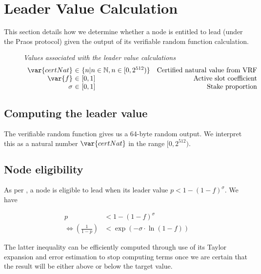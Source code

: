 \newcommand{\N}{\ensuremath{\mathbb{N}}}
\newcommand{\nonceOp}{\star}

\section{Leader Value Calculation}
\label{sec:leader-value-calc}

This section details how we determine whether a node is entitled to lead (under
the Praos protocol) given the output of its verifiable random function
calculation.

\begin{figure}
  \emph{Values associated with the leader value calculations}
  \begin{equation*}
  \begin{array}{r@{~\in~}lr}
    \var{certNat} & \{n | n \in \N, n \in [0,2^{512})\} & \text{Certified natural value from VRF} \\
    \var{f} & [0,1] & \text{Active slot coefficient} \\
    \sigma & [0,1] & \text{Stake proportion}
  \end{array}
  \end{equation*}
\end{figure}

\subsection{Computing the leader value}

The verifiable random function gives us a 64-byte random output. We interpret
this as a natural number $\var{certNat}$ in the range $[0,2^{512})$.

\subsection{Node eligibility}

As per \cite{ouroboros_praos}, a node is eligible to lead when its leader value
$p < 1 - (1 - f)^\sigma$. We have

\begin{align*}
  p & < 1 - (1 -f)^\sigma \\
  \iff \left(\frac{1}{1-p}\right) & < \exp{(-\sigma \cdot \ln{(1-f)})}
\end{align*}

The latter inequality can be efficiently computed through use of its Taylor
expansion and error estimation to stop computing terms once we are certain that
the result will be either above or below the target value.

